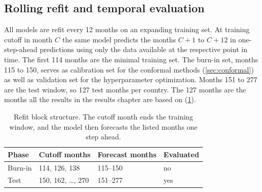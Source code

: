 \subsection{Rolling refit and temporal evaluation}
\label{sec:exp:refit}


All models are refit every 12 months on an expanding training set. At training cutoff in month $C$ the same model predicts the months $C+1$ to $C+12$ in one-step-ahead predictions using only the data available at the respective point in time. The first 114 months are the minimal training set. The burn-in set, months 115 to 150, serves as calibration set for the conformal methods (\cref{sec:conformal}) as well as validation set for the hyperparameter optimization. Months 151 to 277 are the test window, so 127 test months per country. The 127 months are the months all the results in the results chapter are based on (\cref{tab:refit_blocks}).

\begin{table}[htbp]
    \centering
    \small
    \caption{Refit block structure. The cutoff month ends the training window, and the model then forecasts the listed months one step ahead.}
    \label{tab:refit_blocks}
    \begin{tabular}{@{}llll@{}}
        \toprule
        \textbf{Phase} & \textbf{Cutoff months} & \textbf{Forecast months} & \textbf{Evaluated} \\
        \midrule
        Burn-in & 114, 126, 138            & 115--150 & no  \\
        Test    & 150, 162, \dots, 270     & 151--277 & yes \\
        \bottomrule
    \end{tabular}
\end{table}

